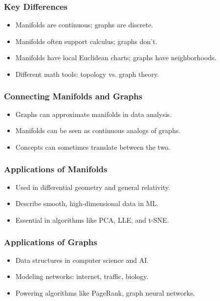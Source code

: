 \begin{frame}[fragile]\frametitle{Key Differences}
    \begin{itemize}
        \item Manifolds are continuous; graphs are discrete.
        \item Manifolds often support calculus; graphs don't.
        \item Manifolds have local Euclidean charts; graphs have neighborhoods.
        \item Different math tools: topology vs. graph theory.
    \end{itemize}
\end{frame}

\begin{frame}[fragile]\frametitle{Connecting Manifolds and Graphs}
    \begin{itemize}
        \item Graphs can approximate manifolds in data analysis.
        \item Manifolds can be seen as continuous analogs of graphs.
        \item Concepts can sometimes translate between the two.
    \end{itemize}
\end{frame}

\begin{frame}[fragile]\frametitle{Applications of Manifolds}
    \begin{itemize}
        \item Used in differential geometry and general relativity.
        \item Describe smooth, high-dimensional data in ML.
        \item Essential in algorithms like PCA, LLE, and t-SNE.
    \end{itemize}
\end{frame}

\begin{frame}[fragile]\frametitle{Applications of Graphs}
    \begin{itemize}
        \item Data structures in computer science and AI.
        \item Modeling networks: internet, traffic, biology.
        \item Powering algorithms like PageRank, graph neural networks.
    \end{itemize}
\end{frame}


